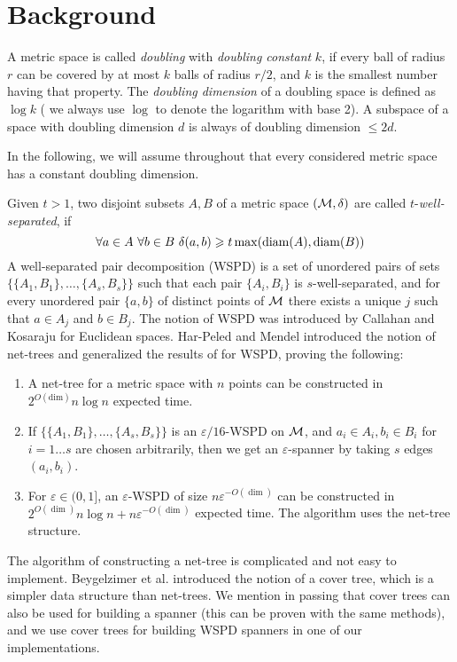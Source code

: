 \documentclass{ws-ijcga}
\renewcommand{\leq}{\leqslant}
\renewcommand{\geq}{\geqslant}
\newcommand{\eps}{\varepsilon}
\begin{document}
\section{Background}
\label{sec:back}
%
A metric space is called \textit{doubling} with \textit{doubling constant} $k$,
if every ball of radius $r$ can be covered by at most $k$ balls of radius $r/2$,
and $k$ is the smallest number having that property.
The \textit{doubling dimension} of a doubling space is defined as $\log k$
(%
we always use $\log$ to denote the logarithm with base 2).
A subspace of a space with doubling dimension $d$ 
is always of doubling dimension $\leq 2d$.

In the following, we will assume throughout that every considered metric space
has a constant doubling dimension.

Given $t > 1$, two disjoint subsets $A, B$ of a metric space $(\mathcal{M}, \delta)$ are called $t$-\textit{well-separated},
if 
\[
\forall a \in A \,\, \forall b \in B \,\, \dist(a, b) \geq t \max(\diam(A), \diam(B))
\]
A well-separated pair decomposition (WSPD) is a set of unordered pairs of sets $\{ \{A_1, B_1 \}, 
\dots, \{A_s, B_s\} \}$ such that each pair $\{A_i, B_i\}$ is $s$-well-separated, and for every unordered pair $\{a, b\}$ 
of distinct points of $\mathcal{M}$ there exists a unique $j$ such that $a \in A_j$ and $b \in B_j$.
The notion of WSPD was introduced by Callahan and Kosaraju \cite{cal-kos-wspd} for Euclidean spaces.
Har-Peled and Mendel \cite{hm-fast} 
introduced the notion of net-trees and
generalized the results of \cite{cal-kos-wspd} for WSPD, proving the following:
\begin{enumerate}
    \item A net-tree for a metric space with $n$ points can be constructed in $2^{O(\mbox{dim})} n \log n$ expected time.
    \item If $\{ \{A_1, B_1 \}, 
\dots, \{A_s, B_s\} \}$ is an $\eps / 16$-WSPD on $\mathcal{M}$, and $a_i \in A_i, b_i \in B_i$ for $i = 1\dots s$
are chosen arbitrarily, then we get an $\eps$-spanner by taking $s$ edges $(a_i, b_i)$.
    \item For $\eps \in (0, 1]$,  an $\eps$-WSPD of size $n \eps^{-O({\dim})}$ can be constructed in $2^{O({\dim})} n \log n + n \eps ^{-O({\dim})}$ expected time. The algorithm uses the net-tree structure.
\end{enumerate}
The algorithm of constructing a net-tree is complicated and not easy to implement. Beygelzimer
et al. \cite{cover-trees} introduced the notion of a cover tree, which is a simpler data structure 
than net-trees. We mention in passing that cover trees can also be used for building
a spanner (this can be proven with the same methods), and we use cover trees for
building WSPD spanners in one of our implementations.
\end{document}
